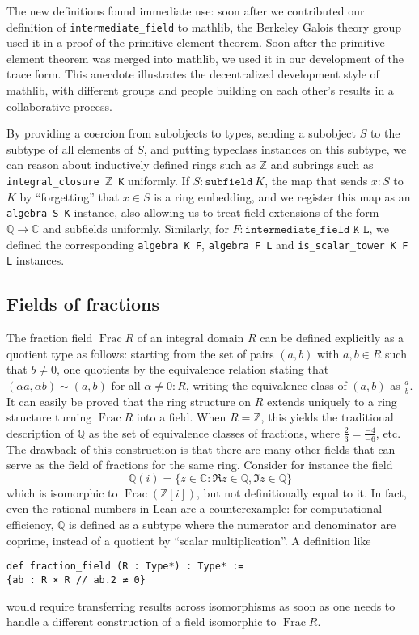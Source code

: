 \documentclass[a4paper,USenglish,cleveref, autoref, thm-restate]{lipics-v2021}
\newcommand{\C}{\mathbb{C}}
\newcommand{\lean}[1]{\texttt{#1}\xspace} %
\newcommand{\mathlib}{\textsf{mathlib}\xspace}
\newcommand{\Q}{\mathbb{Q}}
\newcommand{\Z}{\mathbb{Z}}
\DeclareMathOperator{\Frac}{Frac}
\begin{document}
The new definitions found immediate use:
soon after we contributed our definition of \lean{intermediate\_field} to \mathlib,
the Berkeley Galois theory group used it in a proof of the primitive element theorem.
Soon after the primitive element theorem was merged into \mathlib,
we used it in our development of the trace form.
This anecdote illustrates the decentralized development style of \mathlib,
with different groups and people building on each other's results in a collaborative process.

By providing a coercion from subobjects to types, sending a subobject $S$ to the subtype of all elements of $S$,
and putting typeclass instances on this subtype,
we can reason about inductively defined rings such as $\Z$ and subrings such as \lean{integral\_closure $\Z$ K} uniformly.
If $S : \lean{subfield}\ K$, the map that sends $x : S$ to $K$ by ``forgetting'' that $x \in S$ is a ring embedding,
and we register this map as an \lean{algebra S K} instance, also allowing us to treat field extensions of the form $\Q \to \C$ and subfields uniformly.
Similarly, for $F : \lean{intermediate\_field K L}$, we defined the corresponding \lean{algebra K F}, \lean{algebra F L} and \lean{is\_scalar\_tower K F L} instances.

\subsection{Fields of fractions}\label{subsection : fields of fractions}
The fraction field $\Frac R$ of an integral domain $R$ can be defined explicitly as a quotient type as follows:
starting from the set of pairs $(a,b)$ with $a,b \in R$ such that $b\neq 0$,
one quotients by the equivalence relation stating that $(\alpha a, \alpha b) \sim (a,b)$ for all $\alpha \ne 0 : R$, writing the equivalence class of $(a,b)$ as $\frac{a}{b}$.
It can easily be proved that the ring structure on $R$ extends uniquely to a ring structure turning $\Frac R$ into a field.
When $R=\Z$, this yields the traditional description of $\Q$ as the set of equivalence classes of fractions, where $\frac{2}{3}=\frac{-4}{-6}$, etc.
The drawback of this construction is that there are many other fields that can serve as the field of fractions for the same ring.
Consider for instance the field 
\[
\Q(i)=\{z \in \C : \Re z \in \Q, \Im z\in\Q\}
\]
which is isomorphic to $\Frac (\Z[i])$, but not definitionally equal to it.
In fact, even the rational numbers in Lean are a counterexample:
for computational efficiency, $\Q$ is defined as a subtype where the numerator and denominator are coprime,
instead of a quotient by ``scalar multiplication''. A definition like
\begin{lstlisting}
def fraction_field (R : Type*) : Type* :=
{ab : R × R // ab.2 ≠ 0}
\end{lstlisting}
would require transferring results across isomorphisms as soon as one needs to handle a different construction of a field isomorphic to $\Frac R$.
\end{document}
